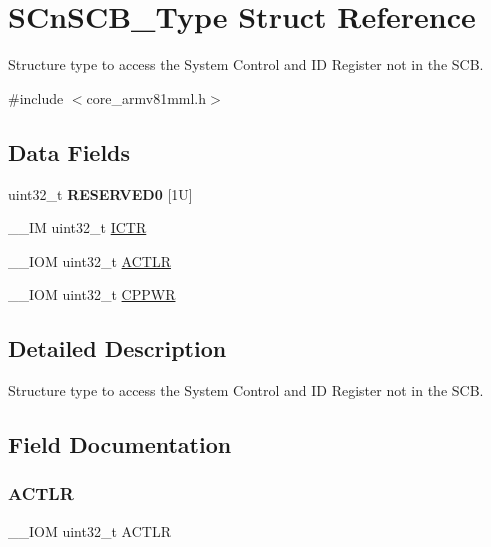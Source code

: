 \hypertarget{struct_s_cn_s_c_b___type}{}\section{S\+Cn\+S\+C\+B\+\_\+\+Type Struct Reference}
\label{struct_s_cn_s_c_b___type}


Structure type to access the System Control and ID Register not in the S\+CB.  




{\ttfamily \#include $<$core\+\_\+armv81mml.\+h$>$}

\subsection*{Data Fields}
\begin{DoxyCompactItemize}
\item 
\mbox{\label{struct_s_cn_s_c_b___type_affae06cd6df5e9fe9a92994052fd3bec}} 
uint32\+\_\+t {\bfseries R\+E\+S\+E\+R\+V\+E\+D0} \mbox{[}1\+U\mbox{]}
\item 
\+\_\+\+\_\+\+IM uint32\+\_\+t \mbox{\hyperlink{struct_s_cn_s_c_b___type_acf9b76331abd768af25a10b3625da4b4}{I\+C\+TR}}
\item 
\+\_\+\+\_\+\+I\+OM uint32\+\_\+t \mbox{\hyperlink{struct_s_cn_s_c_b___type_afabed911b9f91f9df848999e1b5d6504}{A\+C\+T\+LR}}
\item 
\+\_\+\+\_\+\+I\+OM uint32\+\_\+t \mbox{\hyperlink{struct_s_cn_s_c_b___type_a6236035fc90059a599910d9cb9299ff0}{C\+P\+P\+WR}}
\end{DoxyCompactItemize}


\subsection{Detailed Description}
Structure type to access the System Control and ID Register not in the S\+CB. 

\subsection{Field Documentation}
\mbox{\label{struct_s_cn_s_c_b___type_afabed911b9f91f9df848999e1b5d6504}} 
\subsubsection{\texorpdfstring{ACTLR}{ACTLR}}
{\footnotesize\ttfamily \+\_\+\+\_\+\+I\+OM uint32\+\_\+t A\+C\+T\+LR}

